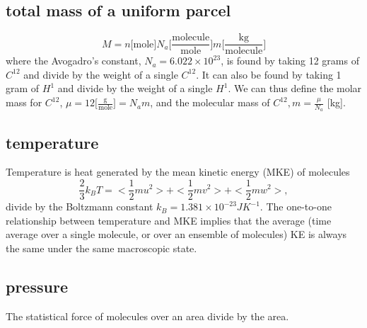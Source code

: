 \setlength\parindent{0pt} %
\subsection{total mass of a uniform parcel}
\begin{equation}
   M = n \big[\text{mole}\big] N_a \big[\frac{\text{molecule}}{\text{mole}}\big] m
       \big[\frac{\text{kg}}{\text{molecule}}\big]
\end{equation}
where the Avogadro's constant, $N_a = 6.022\times10^{23}$, is found by taking 12 grams of
$C^{12}$ and divide by the weight of a single $C^{12}$. It can also be found by taking 1 gram of 
$H^{1}$ and divide by the weight of a single $H^{1}$. We can thus define the molar mass for
$C^{12}$, $\mu = 12 \big[\frac{\text{g}}{\text{mole}}\big] = N_a m$, and the molecular mass of
$C^{12}, m = \frac{\mu}{N_a}$ [kg]. 

\subsection{temperature}
\begin{defn*} Temperature is heat generated by the mean kinetic energy (MKE) of molecules
\begin{equation}
   \frac{2}{3} k_B T = <\frac{1}{2} m u^2> + <\frac{1}{2} m v^2> + <\frac{1}{2} m w^2>,
\end{equation}
divide by the Boltzmann constant $k_B = 1.381 \times 10^{-23} J K^{-1}$. The one-to-one relationship
between temperature and MKE implies that the average (time average over a single molecule, or over
an ensemble of molecules) KE is always the same under the same macroscopic state. 
\end{defn*}

\subsection{pressure}
\begin{defn*} The statistical force of molecules over an area divide by the area. \\
\end{defn*}


